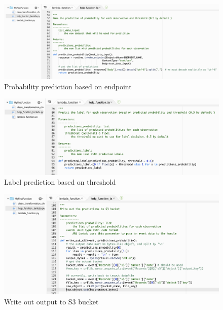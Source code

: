 \documentclass[12pt]{article}
\begin{document}
\begin{figure}[H]
\centering
\begin{minipage}{1\textwidth}
  \centering
  \includegraphics[width=1\linewidth]{help_function_2.png}
   \caption{Probability prediction based on endpoint}
   \label{fig:help_function_2}
\end{minipage}%
\end{figure}

\begin{figure}[H]
\centering
\begin{minipage}{1\textwidth}
  \centering
  \includegraphics[width=1\linewidth]{help_function_3.png}
   \caption{Label prediction based on threshold}
   \label{fig:help_function_3}
\end{minipage}%
\end{figure}

\begin{figure}[H]
\centering
\begin{minipage}{1\textwidth}
  \centering
  \includegraphics[width=1\linewidth]{help_function_4.png}
   \caption{Write out output to S3 bucket}
   \label{fig:help_function_4}
\end{minipage}%
\end{figure}
\end{document}
